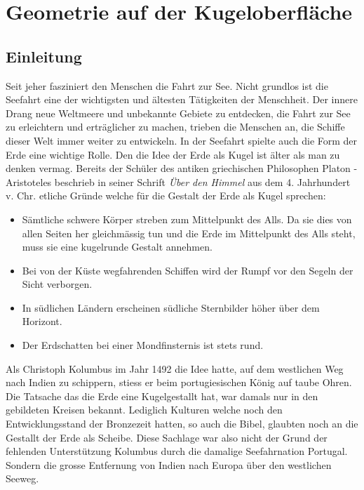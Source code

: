 \chapter{Geometrie auf der Kugeloberfläche\label{chapter:kugel}}
\begin{refsection}

\section{Einleitung}
Seit jeher fasziniert den Menschen die Fahrt zur See. Nicht grundlos ist die Seefahrt eine der wichtigsten und ältesten Tätigkeiten der Menschheit. Der innere Drang neue Weltmeere und unbekannte Gebiete zu entdecken, die Fahrt zur See zu erleichtern und erträglicher zu machen, trieben die Menschen an, die Schiffe dieser Welt immer weiter zu entwickeln.
In der Seefahrt spielte auch die Form der Erde eine wichtige Rolle. Den die Idee der Erde als Kugel ist älter als man zu denken vermag. Bereits der Schüler des antiken griechischen Philosophen Platon - Aristoteles beschrieb in seiner Schrift \textit{Über den Himmel} aus dem 4. Jahrhundert v. Chr. etliche Gründe welche für die Gestalt der Erde als Kugel sprechen:
\begin{itemize}
      \item Sämtliche schwere Körper streben zum Mittelpunkt des Alls. Da sie dies von allen Seiten her gleichmässig tun und die Erde im Mittelpunkt des Alls steht, muss sie eine kugelrunde Gestalt annehmen. 
\item Bei von der Küste wegfahrenden Schiffen wird der Rumpf vor den Segeln der Sicht verborgen. 
\item In südlichen Ländern erscheinen südliche Sternbilder höher über dem Horizont.
\item Der Erdschatten bei einer Mondfinsternis ist stets rund.
\end{itemize}
Als Christoph Kolumbus im Jahr 1492 die Idee hatte, auf dem westlichen Weg nach Indien zu schippern, stiess er beim portugiesischen König auf taube Ohren. 
Die Tatsache das die Erde eine Kugelgestallt hat, war damals nur in den gebildeten Kreisen bekannt. Lediglich Kulturen welche noch den Entwicklungsstand der Bronzezeit hatten, so auch die Bibel, glaubten noch an die Gestallt der Erde als Scheibe.
Diese Sachlage war also nicht der Grund der fehlenden Unterstützung Kolumbus durch die damalige Seefahrnation Portugal. Sondern die grosse Entfernung von Indien nach Europa über den westlichen Seeweg.


\end{refsection}
